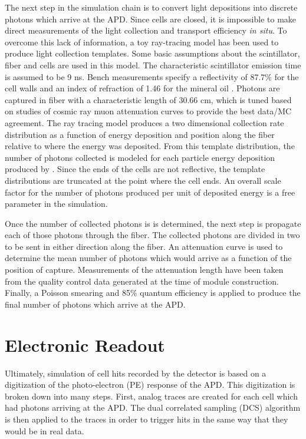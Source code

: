 The next step in the simulation chain is to convert light depositions into discrete photons which arrive at the APD.  Since \nova cells are closed, it is impossible to make direct measurements of the light collection and transport efficiency \textit{in situ}.  To overcome this lack of information, a toy ray-tracing model has been used to produce light collection templates.  Some basic assumptions about the scintillator, fiber and cells are used in this model.  The characteristic scintillator emission time is assumed to be 9 ns.  Bench measurements specify a reflectivity of 87.7\% for the cell walls
\cite{aurisano2015nova}
and an index of refraction of 1.46 for the mineral oil
\cite{mufson2015liquid}.
Photons are captured in fiber with a characteristic length of 30.66 cm, which is tuned based on studies of cosmic ray muon attenuation curves to provide the best data/MC agreement.  The ray tracing model produces a two dimensional collection rate  distribution as a function of energy deposition and position along the fiber relative to where the energy was deposited.  From this template distribution, the number of photons collected is modeled for each particle energy deposition produced by \geant.  Since the ends of the cells are not reflective, the template distributions are truncated at the point where the cell ends.
An overall scale factor for the number of photons produced per unit of deposited energy is a free parameter in the simulation.

Once the number of collected photons is is determined, the next step is propagate each of those photons through the fiber.  The collected photons are divided in two to be sent in either direction along the fiber.  An attenuation curve is used to determine the mean number of photons which would arrive as a function of the position of capture.  Measurements of the attenuation length have been taken from the quality control data generated at the time of module construction.  Finally, a Poisson smearing and 85\% quantum efficiency is applied to produce the final number of photons which arrive at the APD.

\section{Electronic Readout}


Ultimately, simulation of cell hits recorded by the detector is based on a digitization of the photo-electron (PE) response of the APD.  This digitization is broken down into many steps.  First, analog traces are created for each cell which had photons arriving at the APD.  The dual correlated sampling (DCS) algorithm is then applied to the traces in order to trigger hits in the same way that they would be in real data.

